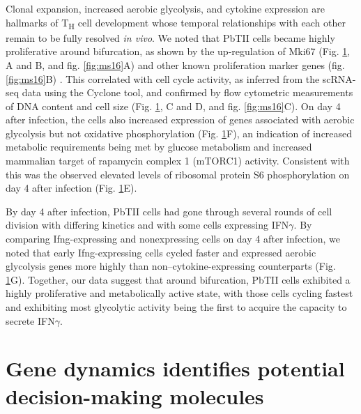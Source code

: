 \begin{figure}
    \label{fig:proliferation}
\end{figure}

Clonal expansion, increased aerobic glycolysis, and cytokine expression are hallmarks of T\textsubscript{H} cell development whose temporal relationships with each other remain to be fully resolved \textit{in vivo}. We noted that PbTII cells became highly proliferative around bifurcation, as shown by the up-regulation of Mki67 (Fig. \ref{fig:proliferation}, A and B, and fig. \ref{fig:ms16}A) and other known proliferation marker genes (fig. \ref{fig:ms16}B) \cite{Whitfield2006-jv}. This correlated with cell cycle activity, as inferred from the scRNA-seq data using the Cyclone tool, and confirmed by flow cytometric measurements of DNA content and cell size (Fig. \ref{fig:proliferation}, C and D, and fig. \ref{fig:ms16}C). On day 4 after infection, the cells also increased expression of genes associated with aerobic glycolysis but not oxidative phosphorylation (Fig. \ref{fig:proliferation}F), an indication of increased metabolic requirements being met by glucose metabolism and increased mammalian target of rapamycin complex 1 (mTORC1) activity. Consistent with this was the observed elevated levels of ribosomal protein S6 phosphorylation on day 4 after infection (Fig. \ref{fig:proliferation}E).

By day 4 after infection, PbTII cells had gone through several rounds of cell division with differing kinetics and with some cells expressing IFN\( \gamma \). By comparing Ifng-expressing and nonexpressing cells on day 4 after infection, we noted that early Ifng-expressing cells cycled faster and expressed aerobic glycolysis genes more highly than non–cytokine-expressing counterparts (Fig. \ref{fig:proliferation}G). Together, our data suggest that around bifurcation, PbTII cells exhibited a highly proliferative and metabolically active state, with those cells cycling fastest and exhibiting most glycolytic activity being the first to acquire the capacity to secrete IFN\( \gamma \).

\section{Gene dynamics identifies potential decision-making molecules}


